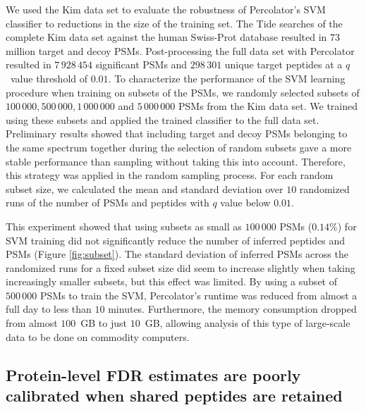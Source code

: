 \documentclass{article}
\begin{document}
We used the Kim data set to evaluate the robustness of Percolator's
SVM classifier to reductions in the size of the training set.  The
Tide searches of the complete Kim data set against the human
Swiss-Prot
database resulted in $73$ million target and decoy PSMs.
Post-processing the full data set with Percolator resulted in
$7\,928\,454$ significant PSMs and $298\,301$ unique target peptides
at a $q$~value threshold of $0.01$.  To characterize the performance
of the SVM learning procedure when training on subsets of the PSMs, we
randomly selected subsets of $100\,000, 500\,000, 1\,000\,000$ and
$5\,000\,000$ PSMs from the Kim data set.  We trained using these
subsets
and applied the trained classifier to the full data set. Preliminary
results showed that including target and decoy PSMs belonging to the
same spectrum together during the selection of random subsets gave a
more stable performance than sampling without taking this into
account. Therefore, this strategy was applied in the random sampling
process. For each random subset size, we calculated the mean and
standard deviation over $10$ randomized runs of the number of PSMs and
peptides with $q$ value below $0.01$.

This experiment showed that using subsets as small as $100\,000$ PSMs
($0.14\%$) for SVM training did not significantly reduce the number of
inferred peptides and PSMs (Figure \ref{fig:subset}). The standard
deviation of inferred PSMs across the randomized runs for a fixed
subset size did seem to increase slightly when taking increasingly
smaller subsets, but this effect was limited. By using a subset of
$500\,000$ PSMs to train the SVM, Percolator's runtime was reduced
from almost a full day to less than $10$ minutes. Furthermore, the
memory consumption dropped from almost $100$~GB to just $10$~GB,
allowing analysis of this type of large-scale data to be done on
commodity computers.

\subsection*{Protein-level FDR estimates are poorly calibrated when
  shared peptides are retained}
\end{document}
